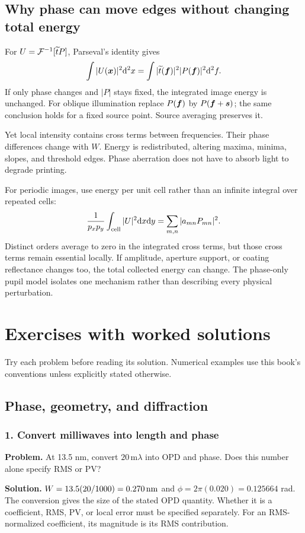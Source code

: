 \section{Why phase can move edges without changing total energy}
For $U=\mathcal{F}^{-1}[\widetilde tP]$, Parseval's identity gives
\begin{equation}
\int|U(\bm{x})|^2\mathrm{d}^2x
=\int|\widetilde t(\bm{f})|^2|P(\bm{f})|^2\mathrm{d}^2f.
\end{equation}
If only phase changes and $|P|$ stays fixed, the integrated image energy
is unchanged. For oblique illumination replace $P(\bm{f})$ by
$P(\bm{f}+\bm{s})$; the same conclusion holds for a fixed source point.
Source averaging preserves it.

Yet local intensity contains cross terms between frequencies.
Their phase differences change with $W$. Energy is redistributed,
altering maxima, minima, slopes, and threshold edges.
Phase aberration does not have to absorb light to degrade printing.

For periodic images, use energy per unit cell rather than an infinite
integral over repeated cells:
\[
\frac1{p_xp_y}\int_{\rm cell}|U|^2\mathrm{d} x\mathrm{d} y
=\sum_{m,n}|a_{mn}P_{mn}|^2.
\]
Distinct orders average to zero in the integrated cross terms,
but those cross terms remain essential locally.
If amplitude, aperture support, or coating reflectance changes too,
the total collected energy can change. The phase-only pupil model
isolates one mechanism rather than describing every physical perturbation.

\chapter{Exercises with worked solutions}\label{app:exercises}
Try each problem before reading its solution. Numerical examples use
this book's conventions unless explicitly stated otherwise.

\section{Phase, geometry, and diffraction}
\subsection*{1. Convert milliwaves into length and phase}
\textbf{Problem.} At 13.5 nm, convert $20\,\mathrm{m}\lambda$
into OPD and phase. Does this number alone specify RMS or PV?

\textbf{Solution.}
$W=13.5(20/1000)=0.270\,\mathrm{nm}$ and
$\phi=2\pi(0.020)=0.125664$ rad.
The conversion gives the size of the stated OPD quantity. Whether it
is a coefficient, RMS, PV, or local error must be specified separately.
For an RMS-normalized coefficient, its magnitude is its RMS contribution.

